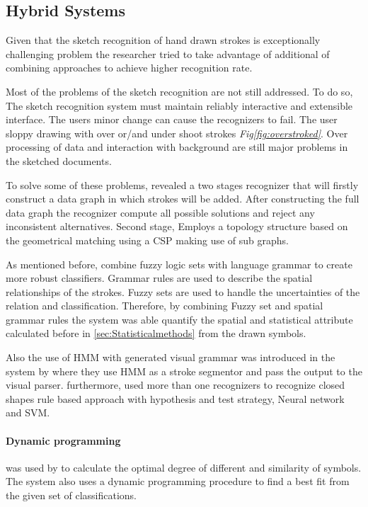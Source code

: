 \subsection{Hybrid Systems}
\label{sec:Hybrid Systems}

Given that the sketch recognition of hand drawn strokes is exceptionally challenging problem the researcher tried to take advantage of additional of combining approaches to achieve higher recognition rate.

Most of the problems of the sketch recognition are not still addressed. To do so, The sketch recognition system must maintain reliably interactive and extensible interface.  The users minor change can cause the recognizers to fail. The user sloppy drawing with over or/and under shoot strokes  \textit{Fig\ref{fig:overstroked}}. Over processing of data and interaction with background are still major problems in the sketched documents.  

To solve some of these problems,\cite{threeproblmes23}  revealed a two stages recognizer that will firstly construct a data graph in which strokes will be added. After constructing the full data graph the recognizer compute all possible solutions and reject any inconsistent alternatives. Second stage, Employs a topology structure based on the geometrical matching using a CSP making use of sub graphs.  

As mentioned before,\cite{visualpattern43,Cali63} combine fuzzy logic sets with language grammar to create more robust classifiers. Grammar rules are used to describe the spatial relationships of the strokes. Fuzzy sets are used to handle the uncertainties of the relation and classification. Therefore, by combining Fuzzy set and spatial grammar rules the system was able quantify the spatial and statistical attribute calculated before in \ref{sec:Statisticalmethods} from the drawn symbols. 

Also the use of HMM with generated visual grammar was introduced in the system by \cite{HMM53} where they use HMM as a stroke segmentor and pass the output to the visual parser. furthermore, \cite{SmartSketch56} used more than one recognizers to recognize closed shapes rule based approach with hypothesis and test strategy, Neural network and SVM.

\paragraph{Dynamic programming}
\label{sec:DynamicProgramming}
 was used by \cite {Mathpad46,templatefrag21}  to calculate the optimal degree of different and similarity of symbols. The system also uses a dynamic programming procedure to find a best fit from the given set of classifications. 

